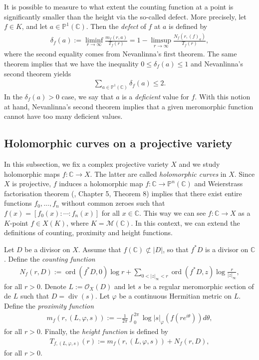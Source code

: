 \documentclass [11pt,reqno]{amsart}
\def\bC{{\mathbb{C}}}
\def\bP{{\mathbb{P}}}
\newcommand{\1}{\mathmybb{1}}
\def\cM{{\mathcal{M}}}
\def\cO{{\mathcal{O}}}
\def\div{\operatorname{div}}
\def\ord{\operatorname{ord}}
\begin{document}
It is possible to measure to what extent the counting function at a point is significantly smaller than the height via the so-called defect. More precisely, let $f\in K$, and let $a\in \bP^1(\bC)$. Then the \emph{defect} of $f$ at $a$ is defined by
\begin{align*}
\delta_f(a) := \displaystyle\liminf_{r\to\infty} \frac{m_f(r,a)}{T_f(r)} = 1 - \limsup_{r\to\infty}\frac{N_f(r,(f)_a)}{T_f(r)},
\end{align*}
where the second equality comes from Nevanlinna's first theorem. The same theorem implies that we have the inequality $0\leq\delta_f(a)\leq 1$ and Nevanlinna's second theorem yields
\begin{align*}
\displaystyle\sum_{a\in\bP^1(\bC)} \delta_f(a) \leq 2.
\end{align*}
In the $\delta_f(a) > 0$ case, we say that $a$ is a \emph{deficient} value for $f$. With this notion at hand, Nevanlinna's second theorem implies that a given meromorphic function cannot have too many deficient values. 

\subsection{Holomorphic curves on a projective variety}
\label{sub:Nevanlinna_holomorphic_curves}

In this subsection, we fix a complex projective variety $X$ and we study holomorphic maps $f : \bC \to X$. The latter are called \emph{holomorphic curves} in $X$. Since $X$ is projective, $f$ induces a holomorphic map $f : \bC \to \bP^n(\bC)$ and Weierstrass factorisation theorem (\cite{Ahlfors66}, Chapter 5, Theorem 8) implies that there exist entire functions $f_0,...,f_n$ without common zeroes such that $f(x) = [f_0(x):\cdots:f_n(x)]$ for all $x\in \bC$. This way we can see $f : \bC \to X$ as a $K$-point $f\in X(K)$, where $K = \cM(\bC)$. In this context, we can extend the definitions of counting, proximity and height functions.

Let $D$ be a divisor on $X$. Assume that $f(\bC) \not\subset |D|$, so that $f^\ast D$ is a divisor on $\bC$. Define the \emph{counting function}
\begin{align*}
N_f(r,D) := \ord(f^\ast D,0)\log r + \displaystyle\sum_{0<|z|_{\infty}<r} \ord(f^\ast D,z)\log\frac{r}{|z|_{\infty}},
\end{align*}
for all $r>0$. Denote $L:= \cO_X(D)$ and let $s$ be a regular meromorphic section of de $L$ such that $D = \div(s)$. Let $\varphi$ be a continuous Hermitian metric on $L$. Define the \emph{proximity function}
\begin{align*}
m_f(r,(L,\varphi,s)) := -\frac{1}{2\pi}\int_{0}^{2\pi} \log |s|_{\varphi}(f(re^{i\theta})) d\theta,
\end{align*}
for all $r>0$. Finally, the \emph{height function} is defined by
\begin{align*}
T_{f,(L,\varphi,s)}(r) := m_f(r,(L,\varphi,s)) + N_f(r,D),
\end{align*}
for all $r>0$. 
\end{document}
